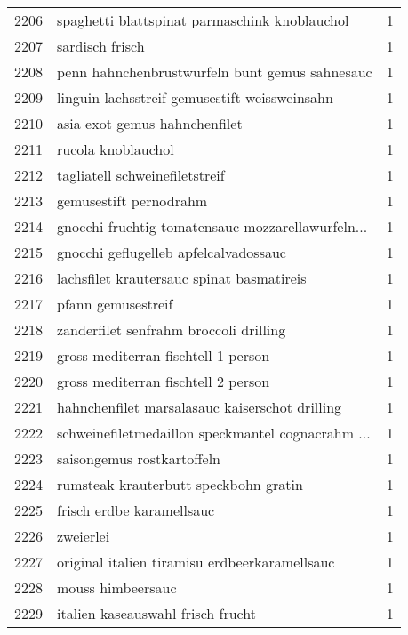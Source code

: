 \begin{tabular}{llr}
2206 &      spaghetti blattspinat parmaschink knoblauchol &      1 \\
2207 &                                    sardisch frisch &      1 \\
2208 &     penn hahnchenbrustwurfeln bunt gemus sahnesauc &      1 \\
2209 &      linguin lachsstreif gemusestift weissweinsahn &      1 \\
2210 &                      asia exot gemus hahnchenfilet &      1 \\
2211 &                                 rucola knoblauchol &      1 \\
2212 &                     tagliatell schweinefiletstreif &      1 \\
2213 &                             gemusestift pernodrahm &      1 \\
2214 &  gnocchi fruchtig tomatensauc mozzarellawurfeln... &      1 \\
2215 &              gnocchi geflugelleb apfelcalvadossauc &      1 \\
2216 &          lachsfilet krautersauc spinat basmatireis &      1 \\
2217 &                                 pfann gemusestreif &      1 \\
2218 &             zanderfilet senfrahm broccoli drilling &      1 \\
2219 &                gross mediterran fischtell 1 person &      1 \\
2220 &                gross mediterran fischtell 2 person &      1 \\
2221 &     hahnchenfilet marsalasauc kaiserschot drilling &      1 \\
2222 &  schweinefiletmedaillon speckmantel cognacrahm ... &      1 \\
2223 &                         saisongemus rostkartoffeln &      1 \\
2224 &              rumsteak krauterbutt speckbohn gratin &      1 \\
2225 &                          frisch erdbe karamellsauc &      1 \\
2226 &                                          zweierlei &      1 \\
2227 &      original italien tiramisu erdbeerkaramellsauc &      1 \\
2228 &                                  mouss himbeersauc &      1 \\
2229 &                  italien kaseauswahl frisch frucht &      1 \\

\end{tabular}
